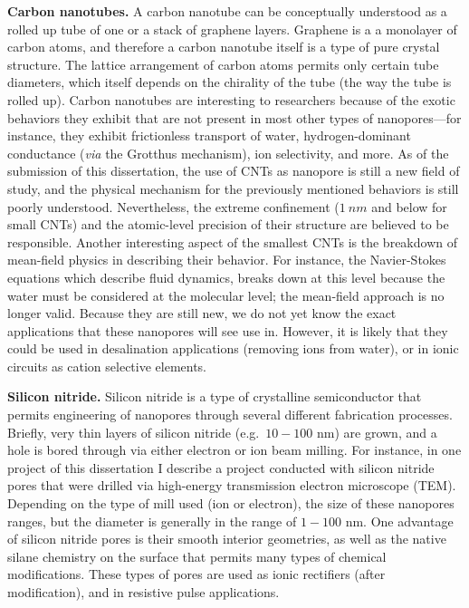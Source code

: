 \documentclass[a4paper,10pt]{article}
\theoremstyle{definition}
\theoremstyle{remark}
\begin{document}
\textbf{Carbon nanotubes.} A carbon nanotube can be conceptually understood as a rolled up tube of one or a stack of graphene layers. Graphene is a a monolayer of carbon atoms, and therefore a carbon nanotube itself is a type of pure crystal structure. The lattice arrangement of carbon atoms permits only certain tube diameters, which itself depends on the chirality of the tube (the way the tube is rolled up). Carbon nanotubes are interesting to researchers because of the exotic behaviors they exhibit that are not present in most other types of nanopores---for instance, they exhibit frictionless transport of water, hydrogen-dominant conductance (\textit{via} the Grotthus mechanism), ion selectivity, and more. As of the submission of this dissertation, the use of CNTs as nanopore is still a new field of study, and the physical mechanism for the previously mentioned behaviors is still poorly understood. Nevertheless, the extreme confinement ($\SI{1}{nm}$ and below for small CNTs) and the atomic-level precision of their structure are believed to be responsible. Another interesting aspect of the smallest CNTs is the breakdown of mean-field physics in describing their behavior. For instance, the Navier-Stokes equations which describe fluid dynamics, breaks down at this level because the water must be considered at the molecular level; the mean-field approach is no longer valid. Because they are still new, we do not yet know the exact applications that these nanopores will see use in. However, it is likely that they could be used in desalination applications (removing ions from water), or in ionic circuits as cation selective elements.

\textbf{Silicon nitride.} Silicon nitride is a type of crystalline semiconductor that permits engineering of nanopores through several different fabrication processes. Briefly, very thin layers of silicon nitride (e.g.~$10-100$ nm) are grown, and a hole is bored through via either electron or ion beam milling. For instance, in one project of this dissertation I describe a project conducted with silicon nitride pores that were drilled via high-energy transmission electron microscope (TEM). Depending on the type of mill used (ion or electron), the size of these nanopores ranges, but the diameter is generally in the range of $1-100$ nm. One advantage of silicon nitride pores is their smooth interior geometries, as well as the native silane chemistry on the surface that permits many types of chemical modifications. These types of pores are used as ionic rectifiers (after modification), and in resistive pulse applications.
\end{document}
